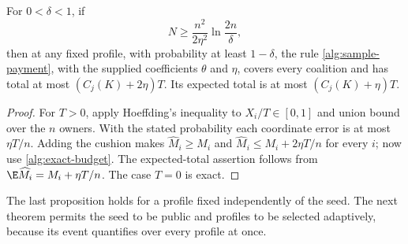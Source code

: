 \begin{proposition}\label{alg:pointwise}
For $0<\delta<1$, if
\[
 N\ge \frac{n^2}{2\eta^2}\ln\frac{2n}{\delta},
\]
then at any fixed profile, with probability at least $1-\delta$, the rule
\eqref{alg:sample-payment}, with the supplied coefficients $\theta$ and $\eta$,
covers every coalition and has total at most
$(C_j(K)+2\eta)T$.  Its expected total is at most $(C_j(K)+\eta)T$.
\end{proposition}
\begin{proof}
For $T>0$, apply Hoeffding's inequality to $X_i/T\in[0,1]$ and union bound
over the $n$ owners.  With the stated probability each coordinate error is
at most $\eta T/n$.  Adding the cushion makes $\widehat M_i\ge M_i$ and
$\widehat M_i\le M_i+2\eta T/n$ for every $i$; now use
\eqref{alg:exact-budget}.  The expected-total assertion follows from
$\E\widehat M_i=M_i+\eta T/n$.  The case $T=0$ is exact.
\end{proof}
The last proposition holds for a profile fixed independently of the seed.
The next theorem permits the seed to be public and profiles to be selected
adaptively, because its event quantifies over every profile at once.

